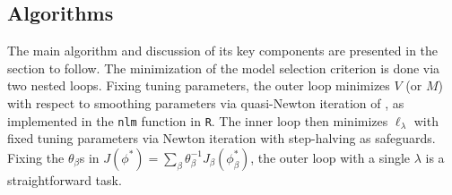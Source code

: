 \documentclass[12pt]{article}
\theoremstyle{definition}
\begin{document}
\subsection{Algorithms}

The main algorithm and discussion of its key components are presented in the section to follow. The minimization of the model selection criterion is done via two nested loops. Fixing tuning parameters, the outer loop minimizes $V$ (or $M$) with respect to smoothing parameters via quasi-Newton iteration of \citet{dennis1996numerical}, as implemented in the \texttt{nlm} function in \texttt{R}. The inner loop then minimizes $\ell_\lambda$ with fixed tuning parameters via Newton iteration with step-halving as safeguards. Fixing the $\theta_\beta$s in $J \left(\phi^*\right) = \sum_\beta \theta^{-1}_\beta J_\beta \left(\phi_\beta^*\right)$, the outer loop with a single $\lambda$ is a straightforward task. 
\end{document}
